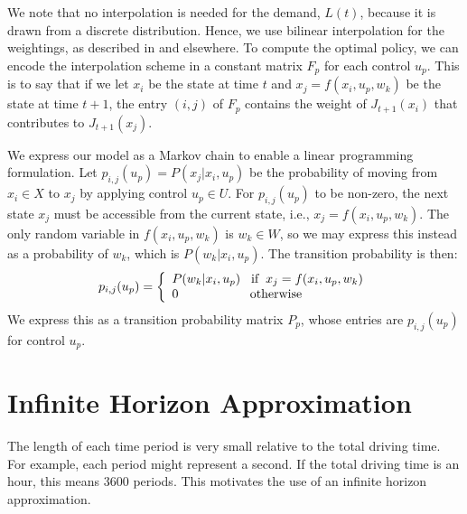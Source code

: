 \documentclass[conference]{IEEEtran}
\begin{document}
We note that no interpolation is needed for the demand, $L(t)$, because it is drawn from a discrete distribution. Hence, we use bilinear interpolation for the weightings, as described in \cite[p.~319]{MultiLinInterp} and elsewhere. To  compute the optimal policy, we can encode the interpolation scheme in a constant matrix $F_{p}$ for each control $u_{p}$. This is to say that if we let $x_{i}$ be the state at time $t$ and $x_{j}=f(x_{i},u_{p},w_{k})$ be the state at time $t+1$, the entry $(i,j)$ of $F_{p}$ contains the weight of $J_{t+1}(x_{i})$ that contributes to $J_{t+1}(x_{j})$.

We express our model as a Markov chain to enable a linear programming formulation. Let $p_{i,j}(u_{p})=P(x_{j}| x_{i},u_{p})$ be the probability of moving from $x_{i}\in X$ to $x_{j}$ by applying control $u_{p}\in U$. For $p_{i,j}(u_{p})$ to be non-zero, the next state $x_{j}$ must be accessible from the current state, i.e., $x_{j}=f(x_{i},u_{p},w_{k})$. The only random variable in $f(x_{i},u_{p},w_{k})$ is $w_{k}\in W$, so we may express this instead as a probability of $w_{k}$, which is $P(w_{k} | x_{i},u_{p})$. The transition probability is then:
\begin{equation} \label{eq:TransMtx}
p_{i,j}(u_{p})=
\left\{
\begin{array}{l}
P(w_{k}|x_{i},u_{p}) \hspace{0.3cm} \text{if} \hspace{0.2cm} x_{j}=f(x_{i},u_{p},w_{k})\\
0 \hspace{2.0cm} \text{otherwise}
\end{array}
\right.
\end{equation} We express this as a transition probability matrix $P_{p}$, whose entries are $p_{i,j}(u_{p})$ for control $u_{p}$.




\section{Infinite Horizon Approximation}
The length of each time period is very small relative to the total driving time. For example, each period might represent a second. If the total driving time is an hour, this means 3600 periods. This motivates the use of an infinite horizon approximation.
\end{document}
